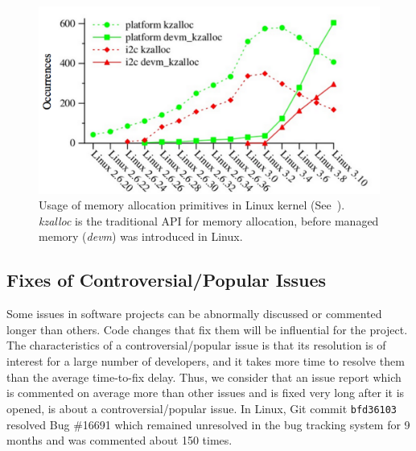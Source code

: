 \begin{figure}[!h]%
    \centering
    \includegraphics[width=0.6\linewidth]{fig/devm}
    \caption{Usage of memory allocation primitives in Linux kernel (See~\cite{recipes_devm}). {\em kzalloc} is the traditional API for memory allocation,
before managed memory ({\em devm}) was introduced in Linux.}
    \label{fig:devm}
\end{figure}


\subsection{Fixes of Controversial/Popular Issues}
Some issues in software projects can be abnormally discussed or commented longer than others.
Code changes that fix them will be influential for the project. The characteristics of a controversial/popular issue
 is that its resolution is of interest for a large number of developers, and it takes more time
to resolve them than the average time-to-fix delay. Thus, we consider that an issue report
which is commented on average more than other issues and is fixed very long after it
is opened, is about a controversial/popular issue. In Linux, Git commit {\tt bfd36103}
resolved Bug \#16691 which remained unresolved in the bug tracking system for 9 months
and was commented about 150 times.
